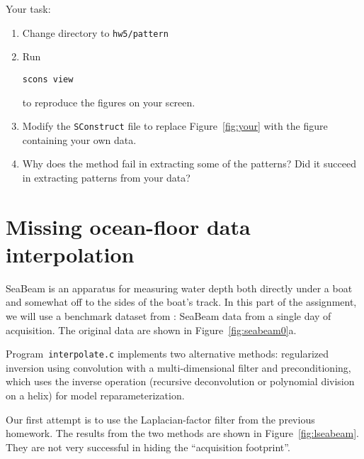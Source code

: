 
\lstset{language=python,numbers=left,numberstyle=\tiny,showstringspaces=false}


Your task:
\begin{enumerate}
\item Change directory to \verb#hw5/pattern#
\item Run 
\begin{verbatim}
scons view
\end{verbatim}
to reproduce the figures on your screen.
\item Modify the \texttt{SConstruct} file to replace Figure~\ref{fig:your} with the figure containing your own data.
\item Why does the method fail in extracting some of the patterns? Did it succeed in extracting patterns from your data?
\end{enumerate}

\section{Missing ocean-floor data interpolation}

SeaBeam is an apparatus for measuring water depth both directly under
a boat and somewhat off to the sides of the boat's track. In this part
of the assignment, we will use a benchmark dataset from \cite{gee}:
SeaBeam data from a single day of acquisition. The original data are
shown in Figure~\ref{fig:seabeam0}a.


Program~\texttt{interpolate.c} implements two alternative methods:
regularized inversion using convolution with a multi-dimensional
filter and preconditioning, which uses the inverse operation
(recursive deconvolution or polynomial division on a helix) for model
reparameterization.

Our first attempt is to use the Laplacian-factor filter from the
previous homework. The results from the two methods are shown in
Figure~\ref{fig:lseabeam}. They are not very successful in hiding
the ``acquisition footprint''.

